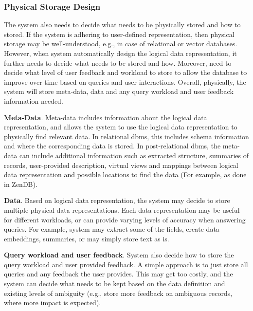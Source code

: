 \subsubsection{Physical Storage Design}
The system also needs to decide what needs to be physically stored and how to stored. If the system is adhering to user-defined representation, then physical storage may be well-understood, e.g., in case of relational or vector databases. However, when system automatically design the logical data representation, it further needs to decide what needs to be stored and how. Moreover,  need to decide what level of user feedback and workload to store to allow the database to improve over time based on queries and user interactions. Overall, physically, the system will store meta-data, data and any query workload and user feedback information needed. 

\textbf{Meta-Data}. Meta-data includes information about the logical data representation, and allows the system to use the logical data representation to physically find relevant data. In relational dbms, this includes schema information and where the corresponding data is stored. In post-relational dbms, the meta-data can include additional information such as extracted structure, summaries of records, user-provided description, virtual views and mappings between logical data representation and possible locations to find the data (For example, as done in ZenDB\cite{lin2024towards}). 


\textbf{Data}. Based on logical data representation, the system may decide to store multiple physical data representations. Each data representation may be useful for different workloads, or can provide varying levels of accuracy when answering queries. For example, system may extract some of the fields, create data embeddings, summaries, or may simply store text as is.

\textbf{Query workload and user feedback}. System also decide how to store the query workload and user provided feedback. A simple approach is to just store all queries and any feedback the user provides. This may get too costly, and the system can decide what needs to be kept based on the data definition and existing levels of ambiguity (e.g., store more feedback on ambiguous records, where more impact is expected).

